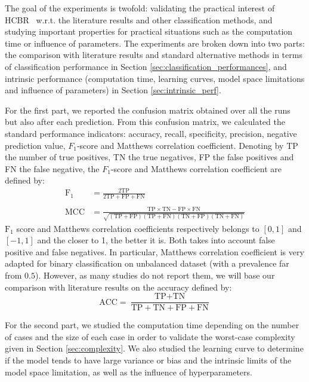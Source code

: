 \documentclass[preprint,12pt]{elsarticle}
\def\HCBR{{\sc HCBR}}
\theoremstyle{definition}
\begin{document}
The goal of the experiments is twofold: validating the practical interest of \HCBR~ w.r.t. the literature results and other classification methods, and studying important properties for practical situations such as the computation time or influence of parameters.
The experiments are broken down into two parts: the comparison with literature results and standard alternative methods in terms of classification performance in Section \ref{sec:classification_performances}, and intrinsic performance (computation time, learning curves, model space limitations and influence of parameters) in Section \ref{sec:intrinsic_perf}. 

 For the first part, we reported the confusion matrix obtained over all the runs but also after each prediction. From this confusion matrix, we calculated the standard performance indicators: accuracy, recall, specificity, precision, negative prediction value, $F_1$-score and Matthews correlation coefficient. Denoting by TP the number of true positives, TN the true negatives, FP the false positives and FN the false negative, the $F_1$-score and Matthews correlation coefficient are defined by:
\begin{align*}
\text{F}_1 & = \frac{2 \text{TP}}{ 2\text{TP} + \text{FP} + \text{FN}} \\
    & \\
\text{MCC} & = \frac{\text{TP} \times \text{TN} - \text{FP} \times \text{FN}}{\sqrt{(\text{TP} + \text{FP})(\text{TP} + \text{FN})(\text{TN} + \text{FP})(\text{TN} + \text{FN})}}
\end{align*}
$\text{F}_1$ score and Matthews correlation coefficients respectively belongs to $[0,1]$ and $[-1,1]$ and the closer to 1, the better it is. Both takes into account false positive and false negatives. In particular, Matthews correlation coefficient is very adapted for binary classification on unbalanced dataset (with a prevalence far from $0.5$). However, as many studies do not report them, we will base our comparison with literature results on the accuracy defined by:
\[
  \text{ACC} = \frac{\text{TP} + \text{TN}}{\text{TP} + \text{TN} + \text{FP} + \text{FN}}
\]

For the second part, we studied the computation time depending on the number of cases and the size of each case in order to validate the worst-case complexity given in Section \ref{sec:complexity}. We also studied the learning curve to determine if the model tends to have large variance or bias and the intrinsic limits of the model space limitation, as well as the influence of hyperparameters.
\end{document}
